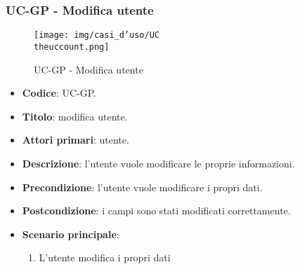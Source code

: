 \subsubsection{UC\theuccount-GP - Modifica utente}
		\begin{figure}[H]
			\centering
				\texttt{[image: img/casi\_d'uso/UC\\theuccount.png]}\\
			\caption{UC\theuccount-GP - Modifica utente}
		\end{figure}
	\begin{itemize}
		\item \textbf{Codice}: UC\theuccount-GP.
		\item \textbf{Titolo}: modifica utente.
		\item \textbf{Attori primari}: utente.
		\item \textbf{Descrizione}: l’utente vuole modificare le proprie informazioni.
		\item \textbf{Precondizione}: l'utente vuole modificare i propri dati.
		\item \textbf{Postcondizione}: i campi sono stati modificati correttamente.
		\item \textbf{Scenario principale}:
		\begin{enumerate}
			\item L'utente modifica i propri dati
		\end{enumerate}
	\end{itemize}



